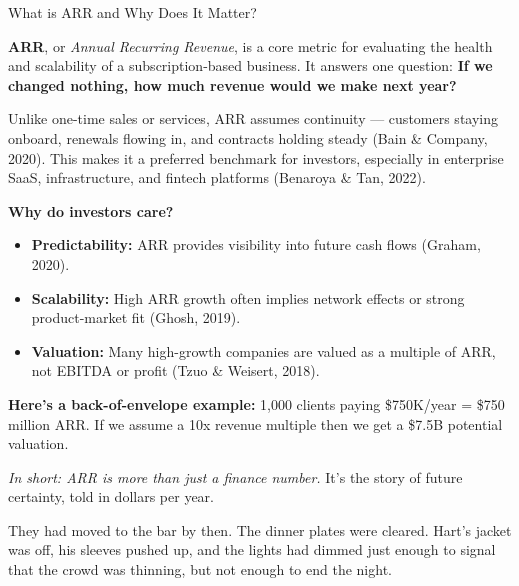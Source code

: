 \medskip

\begin{TechnicalSidebar}{What is ARR and Why Does It Matter?}

    \textbf{ARR}, or \textit{Annual Recurring Revenue}, is a core metric for evaluating the health and scalability of 
    a subscription-based business.  
    It answers one question: \textbf{If we changed nothing, how much revenue would we make next year?}
    
    \medskip
    
    Unlike one-time sales or services, ARR assumes continuity — customers staying onboard, renewals flowing in, and 
    contracts holding steady (Bain \& Company, 2020).  
    This makes it a preferred benchmark for investors, especially in enterprise SaaS, infrastructure, and 
    fintech platforms (Benaroya \& Tan, 2022).
    
    \medskip
    
    \textbf{Why do investors care?}
  
    \medskip
    
    \begin{itemize}
      \item \textbf{Predictability:} ARR provides visibility into future cash flows (Graham, 2020).
      \item \textbf{Scalability:} High ARR growth often implies network effects or strong product-market fit (Ghosh, 2019).
      \item \textbf{Valuation:} Many high-growth companies are valued as a multiple of ARR, not EBITDA or profit 
      (Tzuo \& Weisert, 2018).
    \end{itemize}
    
    \medskip
    
    \textbf{Here's a back-of-envelope example:}  
    1,000 clients paying \$750K/year = \$750 million ARR.  
    If we assume a 10x revenue multiple then we get a \$7.5B potential valuation.
    
    \medskip
    
    \textit{In short: ARR is more than just a finance number.}  
    It’s the story of future certainty, told in dollars per year.
    
\end{TechnicalSidebar}
  

\medskip

They had moved to the bar by then. The dinner plates were cleared. Hart’s jacket was off, his sleeves pushed up, and the 
lights had dimmed just enough to signal that the crowd was thinning, but not enough to end the night.

